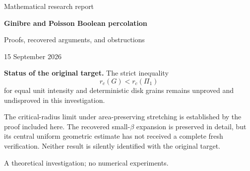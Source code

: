 \documentclass[11pt,a4paper]{article}
\theoremstyle{definition}
\theoremstyle{remark}
\numberwithin{equation}{section}
\begin{document}
\begin{titlepage}
\centering
\vspace*{20mm}
{\Large Mathematical research report\par}
\vspace{9mm}
{\huge\bfseries Ginibre and Poisson Boolean percolation\par}
\vspace{6mm}
{\Large Proofs, recovered arguments, and obstructions\par}
\vspace{15mm}
{\large 15 September 2026\par}
\vfill
\begin{minipage}{0.88\textwidth}
\textbf{Status of the original target.}
The strict inequality
\[
             r_c(G)<r_c(\Pi_1)
\]
for equal unit intensity and deterministic disk grains remains unproved
and undisproved in this investigation.

\medskip
The critical-radius limit under area-preserving stretching is established
by the proof included here. The recovered small-\(\beta\) expansion is
preserved in detail, but its central uniform geometric estimate has not
received a complete fresh verification. Neither result is silently
identified with the original target.
\end{minipage}
\vfill
{\small A theoretical investigation; no numerical experiments.\par}
\end{titlepage}

\begin{abstract}
This report records the investigation of the critical-radius comparison
between planar Ginibre and Poisson Boolean models. It contains complete
proofs of an optimal homogeneous Poisson domination for thinned and
rescaled Ginibre, exact Palm interpolation and Fock variational identities,
buffered conditional Bergman domination, an obstruction to uniform exterior
Palm comparison, and finite-ensemble deletion calculations. It restores
the ellipse route: fixed-eccentricity large-area comparison, quantitative
local Poisson convergence under area-preserving stretching, and a
negative-association block argument proving convergence of the actual
critical radii. It also preserves the small-\(\beta\) asymptotic argument,
with its principal geometric estimate explicitly separated from its
verified algebraic and limiting consequences. The remaining routes are
organized by their mathematical outcomes and exact obstructions.
The full original notes accompany the report; historical claims of audit
success in those notes are not used as substitutes for the proofs here.
No claim of novelty or resolution of the original strict inequality is made.
\end{abstract}
\end{document}
